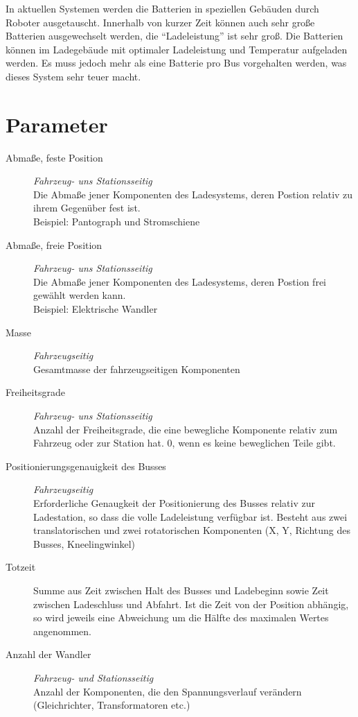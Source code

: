 In aktuellen Systemen werden die Batterien in speziellen Gebäuden durch Roboter ausgetauscht. Innerhalb von kurzer Zeit können auch sehr große Batterien ausgewechselt werden, die "`Ladeleistung"' ist sehr groß. Die Batterien können im Ladegebäude mit optimaler Ladeleistung und Temperatur aufgeladen werden. Es muss jedoch mehr als eine Batterie pro Bus vorgehalten werden, was dieses System sehr teuer macht.


\section{Parameter}

\begin{description}
	\item [Abmaße, feste Position] \emph{Fahrzeug- uns Stationsseitig}\\
	Die Abmaße jener Komponenten des Ladesystems, deren Postion relativ zu ihrem Gegenüber fest ist.\\
	Beispiel: Pantograph und Stromschiene
	\item [Abmaße, freie Position] \emph{Fahrzeug- uns Stationsseitig}\\
	Die Abmaße jener Komponenten des Ladesystems, deren Postion frei gewählt werden kann.\\
	Beispiel: Elektrische Wandler
	\item [Masse] \emph{Fahrzeugseitig}\\
	Gesamtmasse der fahrzeugseitigen Komponenten
	\item [Freiheitsgrade] \emph{Fahrzeug- uns Stationsseitig}\\
	Anzahl der Freiheitsgrade, die eine bewegliche Komponente relativ zum Fahrzeug oder zur Station hat. 0, wenn es keine beweglichen Teile gibt.
	\item [Positionierungsgenauigkeit des Busses] \emph{Fahrzeugseitig} \\
	Erforderliche Genaugkeit der Positionierung des Busses relativ zur Ladestation, so dass die volle Ladeleistung verfügbar ist. Besteht aus zwei translatorischen und zwei rotatorischen Komponenten (X, Y, Richtung des Busses, Kneelingwinkel)
	\item [Totzeit]
	Summe aus Zeit zwischen Halt des Busses und Ladebeginn sowie Zeit zwischen Ladeschluss und Abfahrt. Ist die Zeit von der Position abhängig, so wird jeweils eine Abweichung um die Hälfte des maximalen Wertes angenommen.
	\item [Anzahl der Wandler] \emph{Fahrzeug- und Stationsseitig}\\
	Anzahl der Komponenten, die den Spannungsverlauf verändern (Gleichrichter, Transformatoren etc.)
\end{description}


